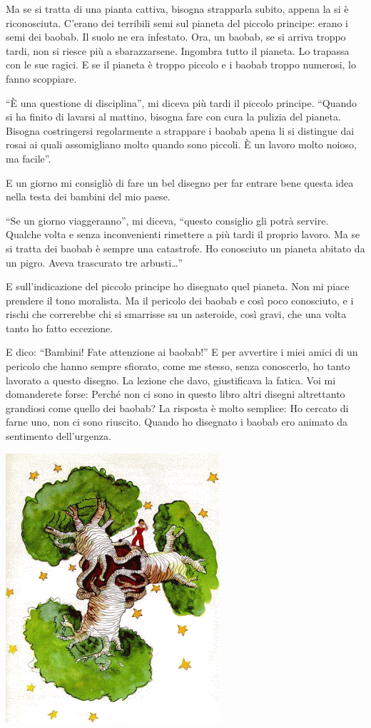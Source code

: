 \documentclass[11pt]{scrbook}
\begin{document}
Ma se si tratta di una pianta cattiva, bisogna strapparla subito, appena la si è riconosciuta. C'erano dei terribili semi sul pianeta del piccolo principe: erano i semi dei baobab. Il suolo ne era infestato. Ora, un baobab, se si arriva troppo tardi, non si riesce più a sbarazzarsene. Ingombra tutto il pianeta. Lo trapassa con le sue ragici. E se il pianeta è troppo piccolo e i baobab troppo numerosi, lo fanno scoppiare.

``È una questione di disciplina'', mi diceva più tardi il piccolo principe. ``Quando si ha finito di lavarsi al mattino, bisogna fare con cura la pulizia del pianeta. Bisogna costringersi regolarmente a strappare i baobab apena li si distingue dai rosai ai quali assomigliano molto quando sono piccoli. È un lavoro molto noioso, ma facile''.

E un giorno mi consigliò di fare un bel disegno per far entrare bene questa idea nella testa dei bambini del mio paese.

``Se un giorno viaggeranno'', mi diceva, ``questo consiglio gli potrà servire. Qualche volta e senza inconvenienti rimettere a più tardi il proprio lavoro. Ma se si tratta dei baobab è sempre una catastrofe. Ho conosciuto un pianeta abitato da un pigro. Aveva trascurato tre arbusti\ldots{}''

E sull'indicazione del piccolo principe ho disegnato quel pianeta. Non mi piace prendere il tono moralista. Ma il pericolo dei baobab e così poco conosciuto, e i rischi che correrebbe chi si smarrisse su un asteroide, così gravi, che una volta tanto ho fatto eccezione.

E dico: ``Bambini! Fate attenzione ai baobab!'' E per avvertire i miei amici di un pericolo che hanno sempre sfiorato, come me stesso, senza conoscerlo, ho tanto lavorato a questo disegno. La lezione che davo, giustificava la fatica. Voi mi domanderete forse: Perché non ci sono in questo libro altri disegni altrettanto grandiosi come quello dei baobab? La risposta è molto semplice: Ho cercato di farne uno, non ci sono riuscito. Quando ho disegnato i baobab ero animato da sentimento dell'urgenza.

\begin{center}
\includegraphics{img/baobaby}
\end{center}
\end{document}
